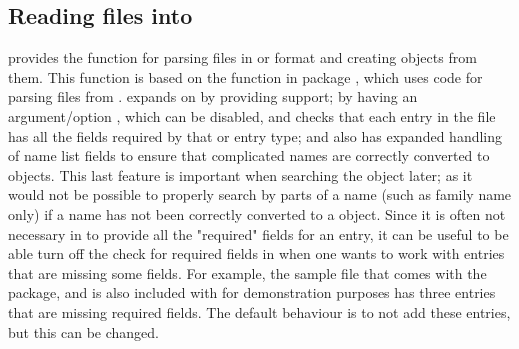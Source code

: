 \documentclass[article]{jss}\usepackage[]{graphicx}\usepackage[]{color}
\newcommand{\ourpkg}{\pkg{RefManageR}}
\begin{document}
\subsection[Reading .bib files into R]{Reading  files into \R{}} 
\ourpkg{} provides the function  for parsing  files in \Biblatex{} or \Bibtex{} format and creating  objects from them.  This function is based on the  function in package  \citep{Rbibtex}, which uses code for parsing \Bibtex{} files from \citet{bibparser}.   expands on  by providing \Biblatex{} support; by having an argument/option , which can be disabled, and checks that each entry in the file has all the fields required by that \Biblatex{} or \Bibtex{} entry type; and also has expanded handling of name list fields to ensure that complicated names are correctly converted to  objects.  This last feature is important when searching the  object later; as it would not be possible to properly search by parts of a name (such as family name only) if a name has not been correctly converted to a  object.  Since it is often not necessary in \Biblatex{} to provide all the "required" fields for an entry, it can be useful to be able turn off the check for required fields in \R{} when one wants to work with entries that are missing some fields.  For example, the sample  file that comes with the \Biblatex{} package, and is also included with \ourpkg{} for demonstration purposes has three entries that are missing required fields.  The default behaviour is to not add these entries, but this can be changed.
\end{document}
